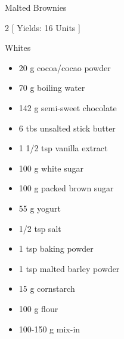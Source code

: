 \begin{Large}
    Malted Brownies
\end{Large}

\begin{scriptsize}
\begin{multicols}{2}
[
\vspace{1em}
Yields: 16 Units
\vspace{-1.5em}
]

Whites
\begin{itemize}
    \item 20 g cocoa/cocao powder
    \item 70 g boiling water 
    \item 142 g semi-sweet chocolate
    \item 6 tbs unsalted stick butter
    \item 1 1/2 tsp vanilla extract

    \item 100 g white sugar
    \item 100 g packed brown sugar
    \item 55 g yogurt

    \item 1/2 tsp salt
    \item 1 tsp baking powder
    \item 1 tsp malted barley powder  %
    \item 15 g cornstarch
    \item 100 g flour
    \item 100-150 g mix-in
\end{itemize}
\end{multicols}
\end{scriptsize}

